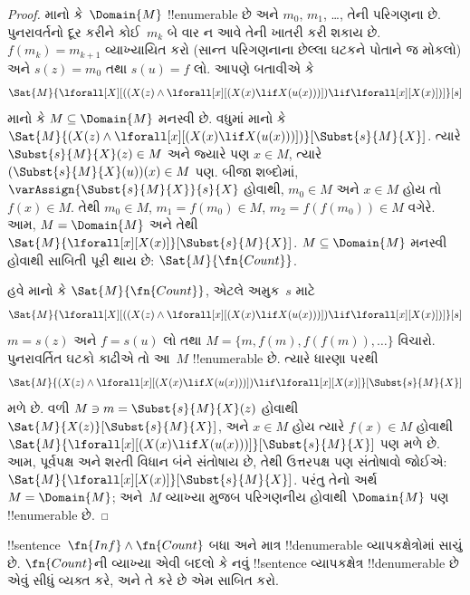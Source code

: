 \documentclass[../../../include/open-logic-section]{subfiles}
\begin{document}
\begin{proof}
માનો કે~$\Domain{M}$ !!{enumerable} છે અને $m_0$, $m_1$, \dots,
તેની પરિગણના છે. પુનરાવર્તનો દૂર કરીને કોઈ~$m_k$ બે વાર ન આવે તેની
ખાતરી કરી શકાય છે. $f(m_k) = m_{k+1}$ વ્યાખ્યાયિત કરો (સાન્ત
પરિગણનાના છેલ્લા ઘટકને પોતાને જ મોકલો) અને $s(z) = m_0$ તથા
$s(u) = f$ લો. આપણે બતાવીએ કે
\[
\Sat{M}{\lforall[X][((X(z) \land \lforall[x][(X(x) \lif X(u(x)))])
    \lif \lforall[x][X(x)])]}[s]
\]
માનો કે $M \subseteq \Domain{M}$ મનસ્વી છે. વધુમાં માનો કે
$\Sat{M}{(X(z) \land \lforall[x][(X(x) \lif
X(u(x)))])}[\Subst{s}{M}{X}]$. ત્યારે
$\Subst{s}{M}{X}(z) \in M$ અને જ્યારે પણ $x \in M$, ત્યારે
$(\Subst{s}{M}{X}(u))(x) \in M$ પણ. બીજા શબ્દોમાં,
$\varAssign{\Subst{s}{M}{X}}{s}{X}$ હોવાથી, $m_0 \in M$ અને
$x \in M$ હોય તો $f(x) \in M$. તેથી $m_0 \in M$,
$m_1 = f(m_0) \in M$, $m_2 = f(f(m_0)) \in M$ વગેરે. આમ,
$M = \Domain{M}$ અને તેથી
$\Sat{M}{\lforall[x][X(x)]}[\Subst{s}{M}{X}]$. $M \subseteq
\Domain{M}$ મનસ્વી હોવાથી સાબિતી પૂરી થાય છે:
$\Sat{M}{\fn{Count}}$.

હવે માનો કે $\Sat{M}{\fn{Count}}$, એટલે અમુક~$s$ માટે
\[
\Sat{M}{\lforall[X][((X(z) \land \lforall[x][(X(x) \lif X(u(x)))])
    \lif \lforall[x][X(x)])]}[s]
\]
$m = s(z)$ અને $f = s(u)$ લો તથા
$M = \{m,
f(m), f(f(m)), \dots\}$ વિચારો. પુનરાવર્તિત ઘટકો કાઢીએ તો
આ~$M$ !!{enumerable} છે. ત્યારે ધારણા પરથી
\[
\Sat{M}{(X(z) \land \lforall[x][(X(x) \lif X(u(x)))] )
    \lif \lforall[x][X(x)]}[\Subst{s}{M}{X}]
\]
મળે છે. વળી $M \ni m =
\Subst{s}{M}{X}(z)$ હોવાથી $\Sat{M}{X(z)}[\Subst{s}{M}{X}]$,
અને $x \in M$ હોય ત્યારે $f(x) \in
M$ હોવાથી $\Sat{M}{\lforall[x][(X(x) \lif
X(u(x)))]}[\Subst{s}{M}{X}]$ પણ મળે છે. આમ, પૂર્વપક્ષ અને
શરતી વિધાન બંને સંતોષાય છે, તેથી ઉત્તરપક્ષ પણ સંતોષાવો જોઈએ:
$\Sat{M}{\lforall[x][X(x)]}[\Subst{s}{M}{X}]$. પરંતુ તેનો અર્થ
$M = \Domain{M}$; અને~$M$ વ્યાખ્યા મુજબ પરિગણનીય હોવાથી
$\Domain{M}$ પણ !!{enumerable} છે.
\end{proof}

\begin{prob}
!!{sentence}~$\fn{Inf} \land \fn{Count}$ બધા અને માત્ર
!!{denumerable} વ્યાપકક્ષેત્રોમાં સાચું છે. $\fn{Count}$ની વ્યાખ્યા
એવી બદલો કે નવું !!{sentence} વ્યાપકક્ષેત્ર !!{denumerable} છે એવું
સીધું વ્યક્ત કરે, અને તે કરે છે એમ સાબિત કરો.
\end{prob}
\end{document}
